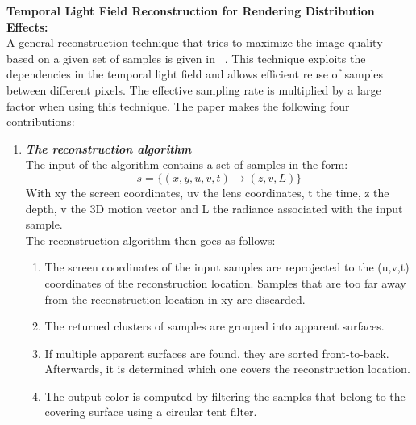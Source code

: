 \textbf{Temporal Light Field Reconstruction for Rendering Distribution Effects:} \\
A general reconstruction technique that tries to maximize the image quality based on a given set of samples is given in ~\cite{Lehtinen2011sg}.
This technique exploits the dependencies in the temporal light field and allows efficient reuse of samples between different pixels.
The effective sampling rate is multiplied by a large factor when using this technique.
The paper makes the following four contributions:
\begin{enumerate}
  \item \textit{\textbf{The reconstruction algorithm}} \\
    The input of the algorithm contains a set of samples in the form:
    \begin{equation}
      s = \{(x,y,u,v,t) \rightarrow (z,v,L)\}
    \end{equation}
    With xy the screen coordinates, uv the lens coordinates, t the time, z the depth, v the 3D motion vector and L the radiance associated with the input sample.
    \\
    The reconstruction algorithm then goes as follows:
    \begin{enumerate}
     \item The screen coordinates of the input samples are reprojected to the (u,v,t) coordinates of the reconstruction location.
      Samples that are too far away from the reconstruction location in xy are discarded.
     \item The returned clusters of samples are grouped into apparent surfaces.
     \item If multiple apparent surfaces are found, they are sorted front-to-back.
      Afterwards, it is determined which one covers the reconstruction location.
     \item The output color is computed by filtering the samples that belong to the covering surface using a circular tent filter.
    \end{enumerate}


\end{enumerate}
